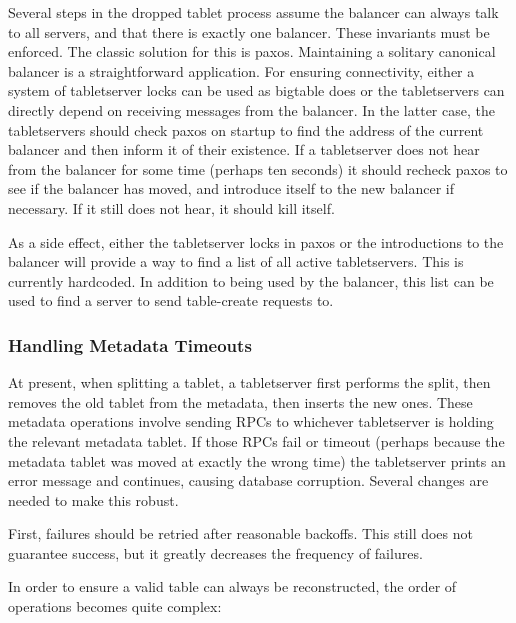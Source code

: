 \documentclass[11pt]{article}
\begin{document}
Several steps in the dropped tablet process assume the balancer can always talk to all servers, and that there is exactly one balancer.  These invariants must be enforced.  The classic solution for this is paxos.  Maintaining a solitary canonical balancer is a straightforward application.  For ensuring connectivity, either a system of tabletserver locks can be used as bigtable does or the tabletservers can directly depend on receiving messages from the balancer.  In the latter case, the tabletservers should check paxos on startup to find the address of the current balancer and then inform it of their existence.  If a tabletserver does not hear from the balancer for some time (perhaps ten seconds) it should recheck paxos to see if the balancer has moved, and introduce itself to the new balancer if necessary.  If it still does not hear, it should kill itself.

As a side effect, either the tabletserver locks in paxos or the introductions to the balancer will provide a way to find a list of all active tabletservers.  This is currently hardcoded.  In addition to being used by the balancer, this list can be used to find a server to send table-create requests to.

\subsubsection{Handling Metadata Timeouts}

At present, when splitting a tablet, a tabletserver first performs the split, then removes the old tablet from the metadata, then inserts the new ones.  These metadata operations involve sending RPCs to whichever tabletserver is holding the relevant metadata tablet.  If those RPCs fail or timeout (perhaps because the metadata tablet was moved at exactly the wrong time) the tabletserver prints an error message and continues, causing database corruption.  Several changes are needed to make this robust.

First, failures should be retried after reasonable backoffs.  This still does not guarantee success, but it greatly decreases the frequency of failures.

In order to ensure a valid table can always be reconstructed, the order of operations becomes quite complex:
\end{document}
